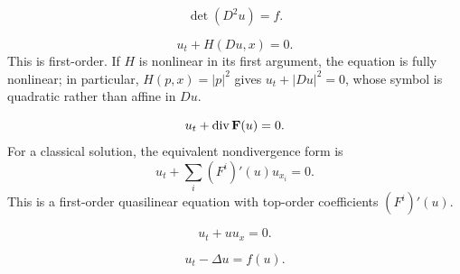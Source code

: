 \begin{example}
\label{ex:monge-ampere-equation}





$$\det(D^2u) = f.$$
\end{example}

\begin{example}
\label{ex:hamilton-jacobi-equation}





$$u_t + H(Du, x) = 0.$$
This is first-order. If $H$ is nonlinear in its first argument, the equation is
fully nonlinear; in particular, $H(p,x)=|p|^2$ gives $u_t+|Du|^2=0$, whose
symbol is quadratic rather than affine in $Du$.
\end{example}

\begin{example}
\label{ex:scalar-conservation-law}





$$u_t + \operatorname{div}\mathbf{F}(u) = 0.$$
For a classical solution, the equivalent nondivergence form is
$$u_t + \sum_i (F^i)'(u)u_{x_i} = 0.$$
This is a first-order quasilinear equation with top-order coefficients $(F^i)'(u)$.
\end{example}

\begin{example}
\label{ex:inviscid-burgers-equation}





$$u_t + uu_x = 0.$$
\end{example}

\begin{example}
\label{ex:scalar-reaction-diffusion-equation}





$$u_t - \Delta u = f(u).$$
\end{example}

